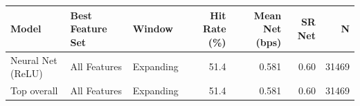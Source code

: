 \begin{tabular}{lllrrrr}
\toprule
Model & Best Feature Set & Window & Hit Rate (\%) & Mean Net (bps) & SR Net & N \\
\midrule
Neural Net (ReLU) & All Features & Expanding & 51.4 & 0.581 & 0.60 & 31469 \\
\midrule
Top overall & All Features & Expanding & 51.4 & 0.581 & 0.60 & 31469 \\
\bottomrule
\end{tabular}
